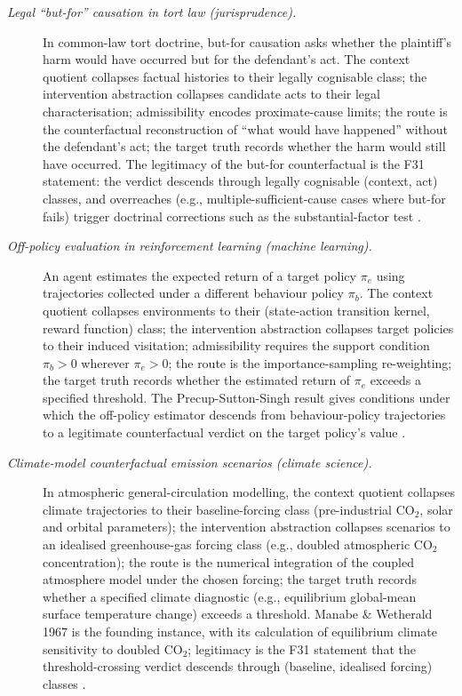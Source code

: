 \documentclass[11pt]{article}
\theoremstyle{definition}
\begin{document}
\begin{description}
\item[\emph{Legal ``but-for'' causation in tort law
(jurisprudence).}]
In common-law tort doctrine, but-for causation asks
whether the plaintiff's harm would have occurred but
for the defendant's act.  The context quotient
collapses factual histories to their legally cognisable
class; the intervention abstraction collapses
candidate acts to their legal characterisation;
admissibility encodes proximate-cause limits; the
route is the counterfactual reconstruction of ``what
would have happened'' without the defendant's act; the
target truth records whether the harm would still have
occurred.  The legitimacy of the but-for
counterfactual is the F31 statement: the verdict
descends through legally cognisable
(context, act) classes, and overreaches (e.g.,
multiple-sufficient-cause cases where but-for fails)
trigger
doctrinal corrections such as the substantial-factor
test \citep{HartHonore1985Causation}.

\item[\emph{Off-policy evaluation in reinforcement
learning (machine learning).}]
An agent estimates the expected return of a target
policy \(\pi_e\) using trajectories collected under a
different behaviour policy \(\pi_b\).  The context
quotient collapses environments to their (state-action
transition kernel, reward function) class; the
intervention abstraction collapses target policies to
their induced visitation; admissibility requires the
support condition \(\pi_b>0\) wherever \(\pi_e>0\);
the route is the importance-sampling re-weighting; the
target truth records whether the estimated return of
\(\pi_e\) exceeds a specified threshold.  The
Precup-Sutton-Singh result gives conditions under
which the off-policy estimator descends from
behaviour-policy trajectories to a legitimate
counterfactual verdict on the target policy's value
\citep{PrecupSuttonSingh2000Eligibility}.

\item[\emph{Climate-model counterfactual emission
scenarios (climate science).}]
In atmospheric general-circulation modelling, the
context quotient collapses climate trajectories to
their baseline-forcing class (pre-industrial CO\(_2\),
solar and orbital parameters); the intervention
abstraction collapses scenarios to an idealised
greenhouse-gas forcing class (e.g., doubled
atmospheric CO\(_2\) concentration); the route is the
numerical integration of the coupled atmosphere
model under the chosen forcing; the target truth
records whether a specified climate diagnostic (e.g.,
equilibrium global-mean surface temperature change)
exceeds a threshold.  Manabe \& Wetherald 1967 is the
founding instance, with its calculation of equilibrium
climate sensitivity to doubled CO\(_2\); legitimacy
is the F31 statement that the threshold-crossing
verdict descends through (baseline, idealised forcing)
classes \citep{ManabeWetherald1967Thermal}.
\end{description}
\end{document}
